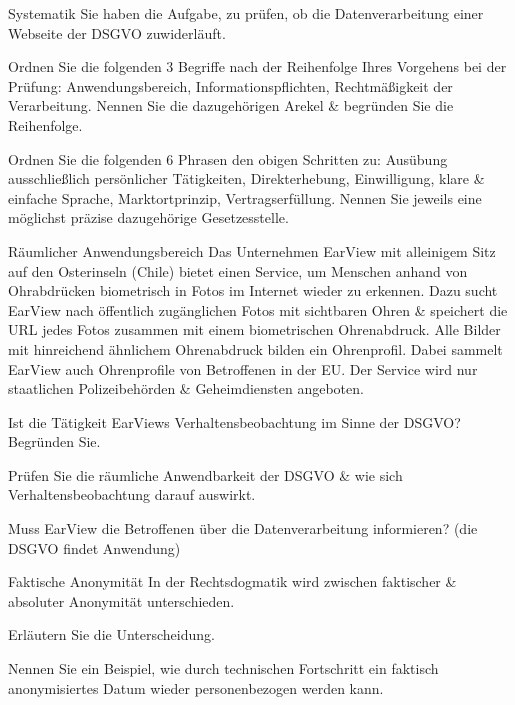 \documentclass{exercisesheet}
\begin{document}
{
\begin{exercise*}{Systematik}{
    Sie haben die Aufgabe, zu prüfen, ob die Datenverarbeitung einer Webseite der DSGVO zuwiderläuft.
  }
  \item Ordnen Sie die folgenden 3 Begriffe nach der Reihenfolge Ihres Vorgehens bei der Prüfung: Anwendungsbereich, Informationspflichten, Rechtmäßigkeit der Verarbeitung. Nennen Sie die dazugehörigen Arekel \& begründen Sie die Reihenfolge.
  \item Ordnen Sie die folgenden 6 Phrasen den obigen Schritten zu: Ausübung ausschließlich persönlicher Tätigkeiten, Direkterhebung, Einwilligung, klare \& einfache Sprache, Marktortprinzip, Vertragserfüllung. Nennen Sie jeweils eine möglichst präzise dazugehörige Gesetzesstelle.
\end{exercise*}

\begin{exercise*}{Räumlicher Anwendungsbereich}{
    Das Unternehmen EarView mit alleinigem Sitz auf den Osterinseln (Chile) bietet einen Service, um Menschen anhand von Ohrabdrücken biometrisch in Fotos im Internet wieder zu erkennen. Dazu sucht EarView nach öffentlich zugänglichen Fotos mit sichtbaren Ohren \& speichert die URL jedes Fotos zusammen mit einem biometrischen Ohrenabdruck. Alle Bilder mit hinreichend ähnlichem Ohrenabdruck bilden ein Ohrenprofil. Dabei sammelt EarView auch Ohrenprofile von Betroffenen in der EU. Der Service wird nur staatlichen Polizeibehörden \& Geheimdiensten angeboten.
  }
  \item Ist die Tätigkeit EarViews Verhaltensbeobachtung im Sinne der DSGVO? Begründen Sie.
  \item Prüfen Sie die räumliche Anwendbarkeit der DSGVO \& wie sich Verhaltensbeobachtung darauf auswirkt.
  \item Muss EarView die Betroffenen über die Datenverarbeitung informieren? (die DSGVO findet Anwendung)
\end{exercise*}

\begin{exercise*}{Faktische Anonymität}{
    In der Rechtsdogmatik wird zwischen faktischer \& absoluter Anonymität unterschieden.
  }
  \item Erläutern Sie die Unterscheidung.
  \item Nennen Sie ein Beispiel, wie durch technischen Fortschritt ein faktisch anonymisiertes Datum wieder personenbezogen werden kann.
\end{exercise*}

}
\end{document}
